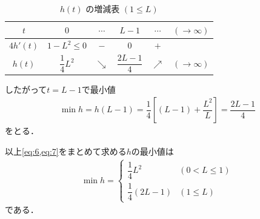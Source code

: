 \documentclass[../../main.tex]{subfiles}
\begin{document}
\begin{table}[htb]
  \centering
  \caption{$h(t)$ の増減表 $(1 \le L)$}
  \label{tab:ht_case2}
  \renewcommand{\arraystretch}{1.5}
  \begin{tabular}{c|ccccc}
    \hline
    $t$      & $0$               & $\cdots$   & $L-1$                     & $\cdots$   & $(\to\infty)$ \\ \hline
    $4h'(t)$  & $1-L^2 \le 0$     & $-$        & $0$                       & $+$        &               \\ \hline
    $h(t)$   & $\dfrac{1}{4}L^2$ & $\searrow$ & $\dfrac{2L-1}{4}$ & $\nearrow$ & $(\to\infty)$ \\ \hline
  \end{tabular}
\end{table}

したがって$t=L-1$で最小値
\begin{align}
  \min h = h(L-1)=\dfrac{1}{4}\left[(L-1)+\dfrac{L^2}{L}\right]=\dfrac{2L-1}{4} \label{eq:7}
\end{align}
をとる．
\casesend

以上\cref{eq:6,eq:7}をまとめて求める$h$の最小値は
\begin{align}
  \min h=
  \begin{cases}
    \dfrac{1}{4}L^2&(0<L\le1)\\
    \dfrac{1}{4}(2L-1)&(1\le L)
  \end{cases}
\end{align}
である．
\end{document}
